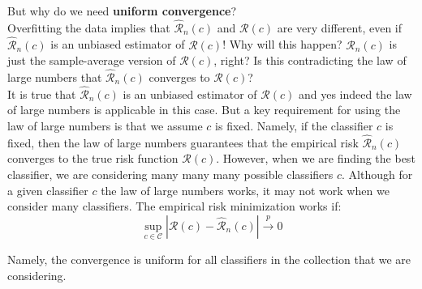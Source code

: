 \documentclass[twoside]{article}
\begin{document}
But why do we need \textbf{uniform convergence}?\\ 
Overfitting the data implies that $\mathcal{\hat{R}}_{n}(c)$ and $\mathcal{R}(c)$ are very different, even if $\mathcal{\hat{R}}_{n}(c)$ is an unbiased
estimator of $\mathcal{R}(c)$!
Why will this happen? $\mathcal{\hat{R}}_{n}(c)$ is just the sample-average version of $\mathcal{R}(c)$, right? Is this contradicting the law
of large numbers that $\mathcal{\hat{R}}_{n}(c)$ converges to $\mathcal{R}(c)$?\\
It is true that $\mathcal{\hat{R}}_{n}(c)$ is an unbiased estimator of $\mathcal{R}(c)$ and yes indeed the law of large numbers is applicable
in this case. But a key requirement for using the law of large numbers is that we assume $c$ is fixed. Namely,
if the classifier $c$ is fixed, then the law of large numbers guarantees that the empirical risk $\mathcal{\hat{R}}_{n}(c)$ converges
to the true risk function $\mathcal{R}(c)$.
However, when we are finding the best classifier, we are considering many many many possible classifiers $c$.
Although for a given classifier $c$ the law of large numbers works, it may not work when we consider many
classifiers. The empirical risk minimization works if:
$$\sup_{c \in \mathcal{C}}{|\mathcal{R}(c) - \mathcal{\hat{R}}_{n}(c)|}  \overset{p}{\to} 0$$

Namely, the convergence is uniform for all classifiers in the collection that we are considering.
\end{document}
